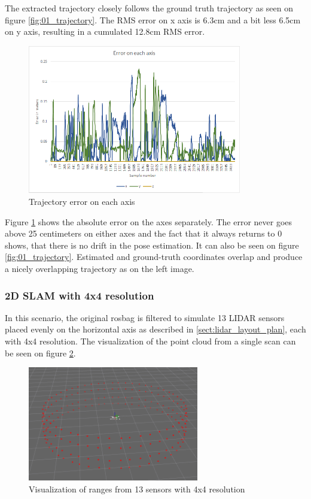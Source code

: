 The extracted trajectory closely follows the ground truth trajectory as seen on figure 
\ref{fig:01_trajectory}. The RMS error on x axis is 6.3cm and a bit less 6.5cm on y axis,
resulting in a cumulated 12.8cm RMS error.

\begin{figure}[!h]
    \centering
	\includegraphics[height=65mm, keepaspectratio]{figures/01_trajectory_error.png}
    \caption{Trajectory error on each axis}
    \label{fig:01_trajectory_error}
\end{figure}

Figure \ref{fig:01_trajectory_error} shows the absolute error on the axes separately. The error 
never goes above 25 centimeters on either axes and the fact that it always returns to 0 shows,
that there is no drift in the pose estimation. It can also be seen on figure 
\ref{fig:01_trajectory}. Estimated and ground-truth coordinates overlap and produce a nicely 
overlapping trajectory as on the left image.










\subsubsection{2D SLAM with 4x4 resolution}
In this scenario, the original rosbag is filtered to simulate 13 LIDAR sensors placed
evenly on the horizontal axis as described in \ref{sect:lidar_layout_plan}, each with
4x4 resolution. The visualization of the point cloud from a single scan can be seen on
figure \ref{fig:02_lidar_layout}. 

\begin{figure}[!h]
    \centering
	\includegraphics[height=50mm, keepaspectratio]{figures/02_lidar_layout.png}
    \caption{Visualization of ranges from 13 sensors with 4x4 resolution}
    \label{fig:02_lidar_layout}
\end{figure}

